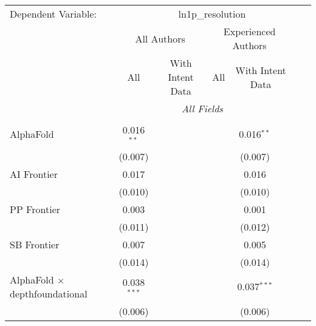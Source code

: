 \begingroup
\centering
\begin{tabular}{lcccccccc}
   \tabularnewline \midrule \midrule
   Dependent Variable: & \multicolumn{8}{c}{ln1p\_resolution}\\
 & \multicolumn{3}{c}{All Authors} & \multicolumn{3}{c}{Experienced Authors} \\
\cmidrule(lr){2-4} \cmidrule(lr){5-7}
 & \multicolumn{1}{c}{All} & \multicolumn{2}{c}{With Intent Data} & \multicolumn{1}{c}{All} & \multicolumn{2}{c}{With Intent Data} \\
\cmidrule(lr){2-2} \cmidrule(lr){3-4} \cmidrule(lr){5-5} \cmidrule(lr){6-7}
 & \multicolumn{6}{c}{\textit{All Fields}} \\ \\
   AlphaFold                                      & 0.016$^{**}$  &                &        &        & 0.016$^{**}$  &                &        &   \\   
                                                  & (0.007)       &                &        &        & (0.007)       &                &        &   \\   
   AI Frontier                                    & 0.017         &                &        &        & 0.016         &                &        &   \\   
                                                  & (0.010)       &                &        &        & (0.010)       &                &        &   \\   
   PP Frontier                                    & 0.003         &                &        &        & 0.001         &                &        &   \\   
                                                  & (0.011)       &                &        &        & (0.012)       &                &        &   \\   
   SB Frontier                                    & 0.007         &                &        &        & 0.005         &                &        &   \\   
                                                  & (0.014)       &                &        &        & (0.014)       &                &        &   \\   
   AlphaFold $\times$ depthfoundational           & 0.038$^{***}$ &                &        &        & 0.037$^{***}$ &                &        &   \\   
                                                  & (0.006)       &                &        &        & (0.006)       &                &        &   \\   

\end{tabular}
